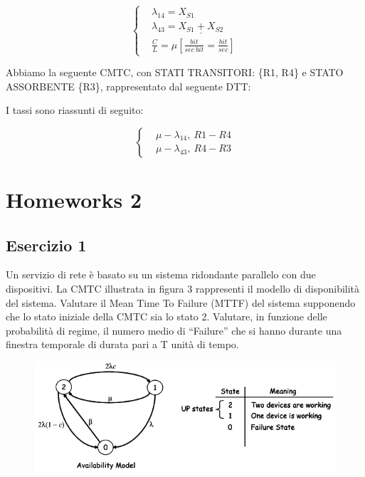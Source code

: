 \[
	\left\{
	\begin{aligned}
	&\lambda_{14}=X_{S1}\\
	&\lambda_{43}=\underline{X_{S1}+X_{S2}}\\
	&\frac{C}{L}=\mu [\frac{bit}{sec\ bit} = \frac{bit}{sec}]
	\end{aligned}
	\right.
\]

Abbiamo la seguente CMTC, con STATI TRANSITORI: \{R1, R4\} e STATO ASSORBENTE \{R3\}, rappresentato dal seguente DTT:

\begin{center}
\end{center}

I tassi sono riassunti di seguito:

\[
	\left\{
	\begin{aligned}
	&\mu-\lambda_{14},\ R1-R4\\
	&\mu-\lambda_{43},\ R4-R3
	\end{aligned}
	\right.
\]

\section{Homeworks 2}

\subsection{Esercizio 1}

Un servizio di rete è basato su un sistema ridondante parallelo con due dispositivi. La CMTC illustrata in figura 3 rappresenti il modello di disponibilità del sistema. Valutare il Mean Time To Failure (MTTF) del sistema supponendo che lo stato iniziale della CMTC sia lo stato 2. Valutare, in funzione delle probabilità di regime, il numero medio di “Failure” che si hanno durante una finestra temporale di durata pari a T unità di tempo.

\begin{center}
\begin{figure}[H]
\centering
\includegraphics[scale=1]{figures/ex/hw21.png}
\end{figure}
\end{center}

